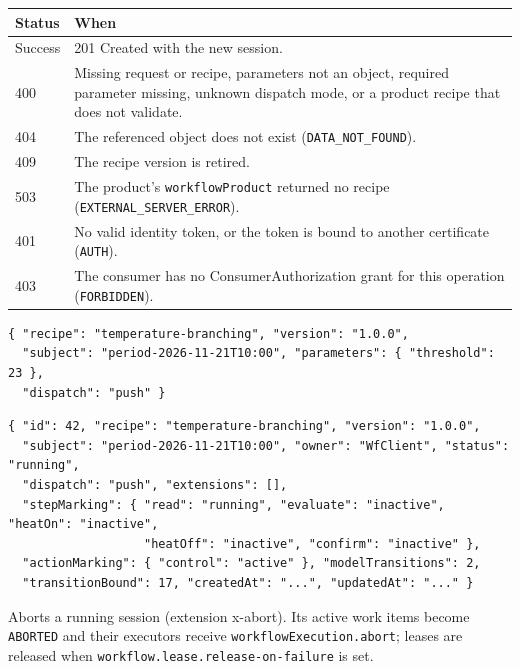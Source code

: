 \documentclass[a4paper]{arrowhead}
\begin{document}
{\small
\begin{longtable}{|p{2.0cm}|p{13.8cm}|}

\hline
\rowcolor{gray!33} Status & When \\ \hline
\endhead
Success & 201 Created with the new session. \\ \hline
400 & Missing request or recipe, parameters not an object, required parameter missing, unknown dispatch mode, or a product recipe that does not validate. \\ \hline
404 & The referenced object does not exist (\texttt{DATA\_\allowbreak{}NOT\_\allowbreak{}FOUND}). \\ \hline
409 & The recipe version is retired. \\ \hline
503 & The product's \texttt{workflow\allowbreak{}Product} returned no recipe (\texttt{EXTERNAL\_\allowbreak{}SERVER\_\allowbreak{}ERROR}). \\ \hline
401 & No valid identity token, or the token is bound to another certificate (\texttt{AUTH}). \\ \hline
403 & The consumer has no ConsumerAuthorization grant for this operation (\texttt{FORBIDDEN}). \\ \hline
\end{longtable}
}


\begin{lstlisting}[caption={Example request body}]
{ "recipe": "temperature-branching", "version": "1.0.0",
  "subject": "period-2026-11-21T10:00", "parameters": { "threshold": 23 },
  "dispatch": "push" }
\end{lstlisting}


\begin{lstlisting}[caption={Example response body}]
{ "id": 42, "recipe": "temperature-branching", "version": "1.0.0",
  "subject": "period-2026-11-21T10:00", "owner": "WfClient", "status": "running",
  "dispatch": "push", "extensions": [],
  "stepMarking": { "read": "running", "evaluate": "inactive", "heatOn": "inactive",
                   "heatOff": "inactive", "confirm": "inactive" },
  "actionMarking": { "control": "active" }, "modelTransitions": 2,
  "transitionBound": 17, "createdAt": "...", "updatedAt": "..." }
\end{lstlisting}

Aborts a running session (extension x-abort). Its active work items become \texttt{ABORTED} and their executors receive \texttt{workflow\allowbreak{}Execution.\allowbreak{}abort}; leases are released when \texttt{workflow.\allowbreak{}lease.\allowbreak{}release-\allowbreak{}on-\allowbreak{}failure} is set.
\end{document}
